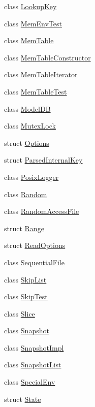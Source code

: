 \begin{DoxyCompactItemize}
\item 
class \hyperlink{classleveldb_1_1_lookup_key}{Lookup\+Key}
\item 
class \hyperlink{classleveldb_1_1_mem_env_test}{Mem\+Env\+Test}
\item 
class \hyperlink{classleveldb_1_1_mem_table}{Mem\+Table}
\item 
class \hyperlink{classleveldb_1_1_mem_table_constructor}{Mem\+Table\+Constructor}
\item 
class \hyperlink{classleveldb_1_1_mem_table_iterator}{Mem\+Table\+Iterator}
\item 
class \hyperlink{classleveldb_1_1_mem_table_test}{Mem\+Table\+Test}
\item 
class \hyperlink{classleveldb_1_1_model_d_b}{Model\+D\+B}
\item 
class \hyperlink{classleveldb_1_1_mutex_lock}{Mutex\+Lock}
\item 
struct \hyperlink{structleveldb_1_1_options}{Options}
\item 
struct \hyperlink{structleveldb_1_1_parsed_internal_key}{Parsed\+Internal\+Key}
\item 
class \hyperlink{classleveldb_1_1_posix_logger}{Posix\+Logger}
\item 
class \hyperlink{classleveldb_1_1_random}{Random}
\item 
class \hyperlink{classleveldb_1_1_random_access_file}{Random\+Access\+File}
\item 
struct \hyperlink{structleveldb_1_1_range}{Range}
\item 
struct \hyperlink{structleveldb_1_1_read_options}{Read\+Options}
\item 
class \hyperlink{classleveldb_1_1_sequential_file}{Sequential\+File}
\item 
class \hyperlink{classleveldb_1_1_skip_list}{Skip\+List}
\item 
class \hyperlink{classleveldb_1_1_skip_test}{Skip\+Test}
\item 
class \hyperlink{classleveldb_1_1_slice}{Slice}
\item 
class \hyperlink{classleveldb_1_1_snapshot}{Snapshot}
\item 
class \hyperlink{classleveldb_1_1_snapshot_impl}{Snapshot\+Impl}
\item 
class \hyperlink{classleveldb_1_1_snapshot_list}{Snapshot\+List}
\item 
class \hyperlink{classleveldb_1_1_special_env}{Special\+Env}
\item 
struct \hyperlink{structleveldb_1_1_state}{State}

\end{DoxyCompactItemize}
